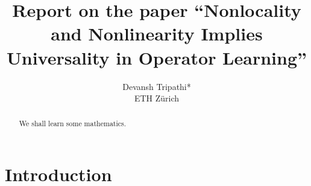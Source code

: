 \documentclass[reqno]{amsart}
\title{Report on the paper ``Nonlocality and Nonlinearity Implies Universality in Operator Learning''}
\author{Devansh Tripathi* \\ ETH Z\lowercase{\"urich}}
\theoremstyle{plain}
\theoremstyle{definition}
\begin{document}
\begin{abstract}
    We shall learn some mathematics.
\end{abstract}
\maketitle
\section{\bf \large Introduction}
\end{document}
